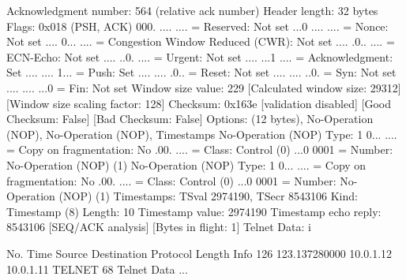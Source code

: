     Acknowledgment number: 564    (relative ack number)
    Header length: 32 bytes
    Flags: 0x018 (PSH, ACK)
        000. .... .... = Reserved: Not set
        ...0 .... .... = Nonce: Not set
        .... 0... .... = Congestion Window Reduced (CWR): Not set
        .... .0.. .... = ECN-Echo: Not set
        .... ..0. .... = Urgent: Not set
        .... ...1 .... = Acknowledgment: Set
        .... .... 1... = Push: Set
        .... .... .0.. = Reset: Not set
        .... .... ..0. = Syn: Not set
        .... .... ...0 = Fin: Not set
    Window size value: 229
    [Calculated window size: 29312]
    [Window size scaling factor: 128]
    Checksum: 0x163e [validation disabled]
        [Good Checksum: False]
        [Bad Checksum: False]
    Options: (12 bytes), No-Operation (NOP), No-Operation (NOP), Timestamps
        No-Operation (NOP)
            Type: 1
                0... .... = Copy on fragmentation: No
                .00. .... = Class: Control (0)
                ...0 0001 = Number: No-Operation (NOP) (1)
        No-Operation (NOP)
            Type: 1
                0... .... = Copy on fragmentation: No
                .00. .... = Class: Control (0)
                ...0 0001 = Number: No-Operation (NOP) (1)
        Timestamps: TSval 2974190, TSecr 8543106
            Kind: Timestamp (8)
            Length: 10
            Timestamp value: 2974190
            Timestamp echo reply: 8543106
    [SEQ/ACK analysis]
        [Bytes in flight: 1]
Telnet
    Data: i

No.     Time           Source                Destination           Protocol Length Info
    126 123.137280000  10.0.1.12             10.0.1.11             TELNET   68     Telnet Data ...

